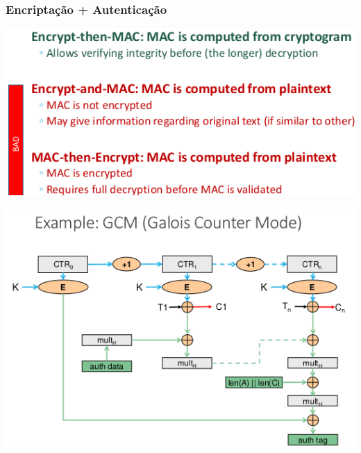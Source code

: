 \documentclass{article}
\begin{document}
\subsubsection{Encriptação + Autenticação}

\begin{center}
  \includegraphics[scale=0.4]{98}

  \vspace{1mm}

  \includegraphics[scale=0.4]{99}
\end{center}
\end{document}

